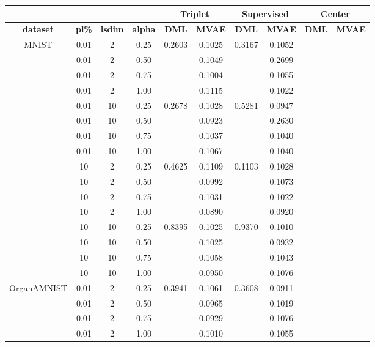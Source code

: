 \documentclass[./dissertation.tex]{subfiles}
\begin{document}
    \begin{table}
    \begin{tabular}{|c|c|c|c|c|c|c|c|c|c|}
            \hline
            & & & &  \multicolumn{2}{|c|}{\textbf{Triplet}} & \multicolumn{2}{|c|}{\textbf{Supervised}} & \multicolumn{2}{|c|}{\textbf{Center}}\\
            \hline
            \textbf{dataset} & \textbf{pl\%} & \textbf{lsdim} & \textbf{alpha} & \textbf{DML} & \textbf{MVAE} & \textbf{DML} & \textbf{MVAE} &
            \textbf{DML} &
            \textbf{MVAE}\\
            \hline
            MNIST & 0.01 & 2 & 0.25 & 0.2603 & 0.1025 & 0.3167 & 0.1052 & & \\
             & 0.01 & 2 & 0.50 & & 0.1049 & & 0.2699 & & \\
             & 0.01 & 2 & 0.75 & & 0.1004 & & 0.1055 & & \\
             & 0.01 & 2 & 1.00 & & 0.1115 & & 0.1022 & & \\
             & 0.01 & 10 & 0.25 & 0.2678 & 0.1028 & 0.5281 & 0.0947 & & \\
             & 0.01 & 10 & 0.50 & & 0.0923 & & 0.2630 & & \\
             & 0.01 & 10 & 0.75 & & 0.1037 & & 0.1040 & & \\
             & 0.01 & 10 & 1.00 & & 0.1067 & & 0.1040 & & \\
             & 10 & 2 & 0.25 & 0.4625 & 0.1109 & 0.1103 & 0.1028 & & \\
             & 10 & 2 & 0.50 & & 0.0992 & & 0.1073  & & \\
             & 10 & 2 & 0.75 & & 0.1031 & & 0.1022 & & \\
             & 10 & 2 & 1.00 & & 0.0890 & & 0.0920 & & \\
             & 10 & 10 & 0.25 & 0.8395 & 0.1025 & 0.9370 & 0.1010 & & \\
             & 10 & 10 & 0.50 & & 0.1025 & & 0.0932 & & \\
             & 10 & 10 & 0.75 & & 0.1058 & & 0.1043 & & \\
             & 10 & 10 & 1.00 & & 0.0950 & & 0.1076 & & \\
             
             OrganAMNIST & 0.01 & 2 & 0.25 & 0.3941 & 0.1061 & 0.3608 & 0.0911 & & \\
             & 0.01 & 2 & 0.50 & & 0.0965 & & 0.1019 & & \\
             & 0.01 & 2 & 0.75 & & 0.0929 & & 0.1076 & & \\
             & 0.01 & 2 & 1.00 & & 0.1010 & & 0.1055 & & \\
             

\end{tabular}
\end{table}
\end{document}
